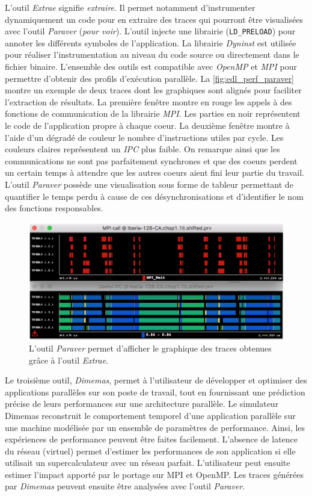             L'outil \textit{Extrae} signifie \textit{extraire}. Il permet notamment d'instrumenter dynamiquement un code pour en extraire des traces qui pourront être visualisées avec l'outil \textit{Paraver} (\textit{pour voir}). L'outil injecte une librairie (\verb=LD_PRELOAD=) pour annoter les différents symboles de l'application. La librairie \textit{Dyninst} est utilisée pour réaliser l'instrumentation au niveau du code source ou directement dans le fichier binaire. L'ensemble des outils est compatible avec \textit{OpenMP} et \textit{MPI} pour permettre d'obtenir des profils d'exécution parallèle. La \autoref{fig:edl_perf_paraver} montre un exemple de deux traces dont les graphiques sont alignés pour faciliter l'extraction de résultats. La première fenêtre montre en rouge les appels à des fonctions de communication de la librairie \textit{MPI}. Les parties en noir représentent le code de l'application propre à chaque coeur. La deuxième fenêtre montre à l'aide d'un dégradé de couleur le nombre d'instructions utiles par cycle. Les couleurs claires représentent un \textit{IPC} plus faible. On remarque ainsi que les communications ne sont pas parfaitement synchrones et que des coeurs perdent un certain temps à attendre que les autres coeurs aient fini leur partie du travail. L'outil \textit{Paraver} possède une visualisation sous forme de tableur permettant de quantifier le temps perdu à cause de ces désynchronisations et d'identifier le nom des fonctions responsables.  
        
            \begin{figure}
            \center
            \includegraphics[width=12cm]{images/edl_perf_paraver.png}
            \caption{\label{fig:edl_perf_paraver} L'outil \textit{Paraver} permet d'afficher le graphique des traces obtenues grâce à l'outil \textit{Extrae}.}
            \end{figure}
            
            Le troisième outil, \textit{Dimemas}, permet à l'utilisateur de développer et optimiser des applications parallèles sur son poste de travail, tout en fournissant une prédiction précise de leurs performances sur une architecture parallèle. Le simulateur Dimemas reconstruit le comportement temporel d'une application parallèle sur une machine modélisée par un ensemble de paramètres de performance. Ainsi, les expériences de performance peuvent être faites facilement. L'absence de latence du réseau (virtuel) permet d'estimer les performances de son application si elle utilisait un supercalculateur avec un réseau parfait. L'utilisateur peut ensuite estimer l'impact apporté par le portage sur MPI et OpenMP. Les traces générées par \textit{Dimemas} peuvent ensuite être analysées avec l'outil \textit{Paraver}.


